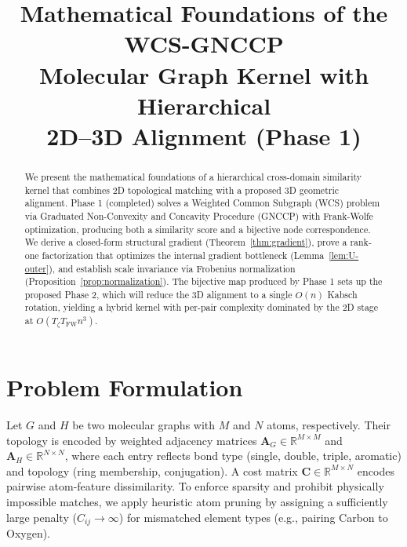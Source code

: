\documentclass[conference]{IEEEtran}
\begin{document}
\title{Mathematical Foundations of the WCS-GNCCP\\Molecular Graph Kernel with Hierarchical\\2D--3D Alignment (Phase 1)}

\author{%
}

\maketitle

\begin{abstract}
We present the mathematical foundations of a hierarchical cross-domain
similarity kernel that combines 2D topological matching with a proposed 3D
geometric alignment. Phase 1 (completed) solves a Weighted Common Subgraph
(WCS) problem via Graduated Non-Convexity and Concavity Procedure
(GNCCP) with Frank-Wolfe optimization, producing both a similarity
score and a bijective node correspondence. We derive a closed-form
structural gradient (Theorem~\ref{thm:gradient}), prove a rank-one
factorization that optimizes the internal gradient bottleneck
(Lemma~\ref{lem:U-outer}), and establish scale invariance
via Frobenius normalization (Proposition~\ref{prop:normalization}).
The bijective map produced by Phase 1 sets up the proposed Phase 2,
which will reduce the 3D alignment
to a single $O(n)$ Kabsch rotation, yielding a hybrid kernel
with per-pair complexity dominated by the 2D stage at
$O(T_\zeta T_{\mathrm{FW}} n^3)$.
\end{abstract}


\section{Problem Formulation}
\label{sec:formulation}

Let $G$ and $H$ be two molecular graphs with $M$ and $N$ atoms, respectively.
Their topology is encoded by weighted adjacency matrices
$\mathbf{A}_G \!\in\! \mathbb{R}^{M \times M}$ and
$\mathbf{A}_H \!\in\! \mathbb{R}^{N \times N}$,
where each entry reflects bond type (single, double, triple, aromatic)
and topology (ring membership, conjugation).
A cost matrix $\mathbf{C} \!\in\! \mathbb{R}^{M \times N}$ encodes pairwise
atom-feature dissimilarity. To enforce sparsity and prohibit physically impossible matches, we apply heuristic atom pruning by assigning a sufficiently large penalty ($C_{ij} \to \infty$) for mismatched element types (e.g., pairing Carbon to Oxygen).
\end{document}
